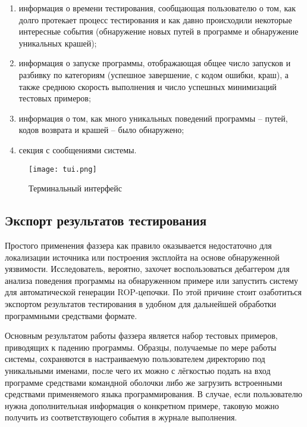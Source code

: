 \begin{enumerate}
	\item информация о времени тестирования, сообщающая пользователю о том, как долго протекает процесс тестирования и как давно происходили некоторые интересные события (обнаружение новых путей в программе и обнаружение уникальных крашей);
	
	\item информация о запуске программы, отображающая общее число запусков и разбивку по категориям (успешное завершение, с кодом ошибки, краш), а также среднюю скорость выполнения и число успешных минимизаций тестовых примеров;
	
	\item информация о том, как много уникальных поведений программы -- путей, кодов возврата и крашей -- было обнаружено;
	
	\item секция с сообщениями системы.
\end{enumerate}

\begin{figure}[h]
	\centering
	\texttt{[image: tui.png]}
	\caption{Терминальный интерфейс}
	\label{fig:tui}
\end{figure}%

\subsection{Экспорт результатов тестирования}

Простого применения фаззера как правило оказывается недостаточно для локализации источника или построения эксплойта на основе обнаруженной уязвимости. Исследователь, вероятно, захочет воспользоваться дебаггером для анализа поведения программы на обнаруженном примере или запустить систему для автоматической генерации ROP-цепочки. По этой причине стоит озаботиться экспортом результатов тестирования в удобном для дальнейшей обработки программными средствами формате.

Основным результатом работы фаззера является набор тестовых примеров, приводящих к падению программы. Образцы, получаемые по мере работы системы, сохраняются в настраиваемую пользователем директорию под уникальными именами, после чего их можно с лёгкостью подать на вход программе средствами командной оболочки либо же загрузить встроенными средствами применяемого языка программирования. В случае, если пользователю нужна дополнительная информация о конкретном примере, таковую можно получить из соответствующего события в журнале выполнения.

